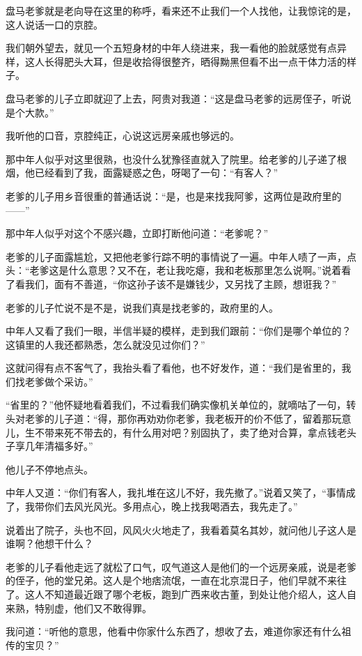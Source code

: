 盘马老爹就是老向导在这里的称呼，看来还不止我们一个人找他，让我惊诧的是，这人说话一口的京腔。

我们朝外望去，就见一个五短身材的中年人绕进来，我一看他的脸就感觉有点异样，这人长得肥头大耳，但是收拾得很整齐，晒得黝黑但看不出一点干体力活的样子。

盘马老爹的儿子立即就迎了上去，阿贵对我道：“这是盘马老爹的远房侄子，听说是个大款。”

我听他的口音，京腔纯正，心说这远房亲戚也够远的。

那中年人似乎对这里很熟，也没什么犹豫径直就入了院里。给老爹的儿子递了根烟，他已经看到了我，面露疑惑之色，呀喝了一句：“有客人？”

老爹的儿子用乡音很重的普通话说：“是，也是来找我阿爹，这两位是政府里的——”

那中年人似乎对这个不感兴趣，立即打断他问道：“老爹呢？”

老爹的儿子面露尴尬，又把他老爹行踪不明的事情说了一遍。中年人啧了一声，点头：“老爹这是什么意思？又不在，老让我吃瘪，我和老板那里怎么说啊。”说着看了看我们，面有不善道，“你这孙子该不是嫌钱少，又另找了主顾，想诳我？”

老爹的儿子忙说不是不是，说我们真是找老爹的，政府里的人。

中年人又看了我们一眼，半信半疑的模样，走到我们跟前：“你们是哪个单位的？这镇里的人我还都熟悉，怎么就没见过你们？”

这就问得有点不客气了，我抬头看了看他，也不好发作，道：“我们是省里的，我们找老爹做个采访。”

“省里的？”他怀疑地看着我们，不过看我们确实像机关单位的，就嘀咕了一句，转头对老爹的儿子道：“得，那你再劝劝你老爹，我老板开的价不低了，留着那玩意儿，生不带来死不带去的，有什么用对吧？别固执了，卖了绝对合算，拿点钱老头子享几年清福多好。”

他儿子不停地点头。

中年人又道：“你们有客人，我扎堆在这儿不好，我先撤了。”说着又笑了，“事情成了，我带你们去风光风光。多用点心，晚上找我喝酒去，我先走了。”

说着出了院子，头也不回，风风火火地走了，我看着莫名其妙，就问他儿子这人是谁啊？他想干什么？

老爹的儿子看他走远了就松了口气，叹气道这人是他们的一个远房亲戚，说是老爹的侄子，他的堂兄弟。这人是个地痞流氓，一直在北京混日子，他们早就不来往了。这人不知道最近跟了哪个老板，跑到广西来收古董，到处让他介绍人，这人自来熟，特别虚，他们又不敢得罪。

我问道：“听他的意思，他看中你家什么东西了，想收了去，难道你家还有什么祖传的宝贝？”

